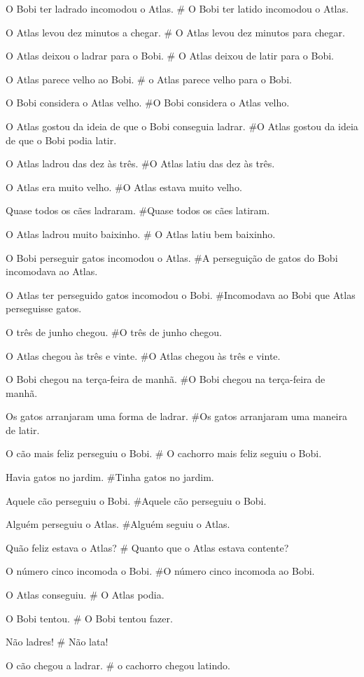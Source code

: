 O Bobi ter ladrado incomodou o Atlas.
# O Bobi ter latido incomodou o Atlas.

O Atlas levou dez minutos a chegar.
# O Atlas levou dez minutos para chegar.

O Atlas deixou o ladrar para o Bobi.
# O Atlas deixou de latir para o Bobi.

O Atlas parece velho ao Bobi.
# o Atlas parece velho para o Bobi.

O Bobi considera o Atlas velho.
#O Bobi considera o Atlas velho.

O Atlas gostou da ideia de que o Bobi conseguia ladrar.
#O Atlas gostou da ideia de que o Bobi podia latir.

O Atlas ladrou das dez às três.
#O Atlas latiu das dez às três.

O Atlas era muito velho.
#O Atlas estava muito velho.

Quase todos os cães ladraram.
#Quase todos os cães latiram.

O Atlas ladrou muito baixinho.
# O Atlas latiu bem baixinho.

O Bobi perseguir gatos incomodou o Atlas.
#A perseguição de gatos do Bobi incomodava ao Atlas.

O Atlas ter perseguido gatos incomodou o Bobi.
#Incomodava ao Bobi que Atlas perseguisse gatos.

O três de junho chegou.
#O três de junho chegou.

O Atlas chegou às três e vinte.
#O Atlas chegou às três e vinte.

O Bobi chegou na terça-feira de manhã.
#O Bobi chegou na terça-feira de manhã.

Os gatos arranjaram uma forma de ladrar.
#Os gatos arranjaram uma maneira de latir.

O cão mais feliz perseguiu o Bobi.
# O cachorro mais feliz seguiu o Bobi.

Havia gatos no jardim.
#Tinha gatos no jardim.

Aquele cão perseguiu o Bobi.
#Aquele cão perseguiu o Bobi.

Alguém perseguiu o Atlas.
#Alguém seguiu o Atlas.

Quão feliz estava o Atlas?
# Quanto que o Atlas estava contente?

O número cinco incomoda o Bobi.
#O número cinco incomoda ao Bobi.

O Atlas conseguiu.
# O Atlas podia.

O Bobi tentou.
# O Bobi tentou fazer.

Não ladres!
# Não lata!

O cão chegou a ladrar.
# o cachorro chegou latindo.
